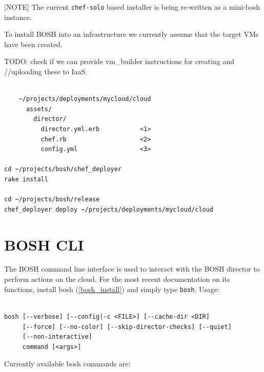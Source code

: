 [NOTE]
The current \texttt{chef-solo} based installer is being re-written as a
mini-bosh instance.

To install BOSH into an infrastructure we currently assume that the
target VMs have been created.

TODO: check if we can provide vm\_builder instructions for creating and
/\slash uploading these to IaaS.

\begin{adjustwidth}{2.5em}{2.5em}
\begin{verbatim}

    ~/projects/deployments/mycloud/cloud
      assets/
        director/
          director.yml.erb           <1>
          chef.rb                    <2>
          config.yml                 <3>

cd ~/projects/bosh/chef_deployer
rake install

cd ~/projects/bosh/release
chef_deployer deploy ~/projects/deployments/mycloud/cloud

\end{verbatim}
\end{adjustwidth}

\chapter{BOSH CLI}
\label{bosh_cli}

The BOSH command line interface is used to interact with the BOSH director to perform actions on the cloud. For the most recent documentation on its functions, install bosh (\autoref{bosh_install}) and simply type \texttt{bosh}. Usage:

\begin{adjustwidth}{2.5em}{2.5em}
\begin{verbatim}

bosh [--verbose] [--config|-c <FILE>] [--cache-dir <DIR]
     [--force] [--no-color] [--skip-director-checks] [--quiet]
     [--non-interactive]
     command [<args>]

\end{verbatim}
\end{adjustwidth}

Currently available bosh commands are:

